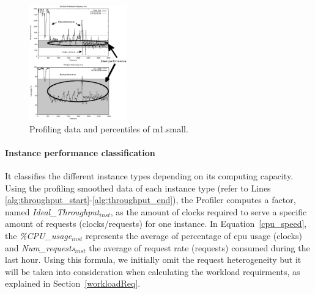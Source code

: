 \begin{figure}[t]
  \begin{center}
    \includegraphics[width=0.8\linewidth, height=5cm]{images/idealSmallRemark.pdf}
  \end{center}
  \caption{Profiling data and percentiles of m1.small.}
  \label{fig:vm_performance1}
\end{figure}



\paragraph{Instance performance classification} It classifies the different instance types depending on its computing capacity. Using the profiling smoothed data of each instance type (refer to Lines \ref{alg:throughput_start}-\ref{alg:throughput_end}), the Profiler computes a factor, named \emph{Ideal\_Throughput$_{inst}$}, as the amount of clocks required to serve a specific amount of requests (clocks/requests)  for one instance. In Equation~\ref{cpu_speed}, the \emph{\%CPU\_usage$_{inst}$} represents the average of percentage of cpu usage (clocks) and \emph{Num\_requests$_{inst}$} the average of request rate (requests) consumed during the last hour. Using this formula, we initially omit the request heterogeneity but it will be taken into consideration when calculating the workload requirments, as explained in Section~\ref{workloadReq}.

